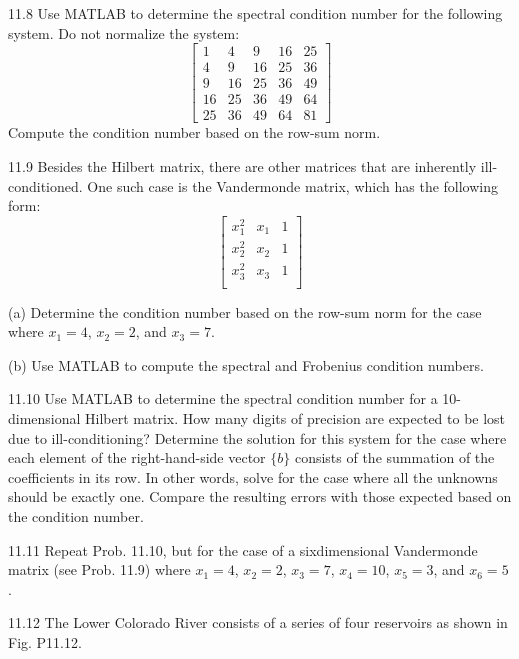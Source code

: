 \documentclass[../main.tex]{subfiles}
\begin{document}
11.8 Use MATLAB to determine the spectral condition number for the following system. Do not normalize the system:
\begin{equation}
\begin{bmatrix}
1& 4& 9& 16& 25\\
4& 9& 16& 25& 36\\
9& 16& 25& 36& 49\\
16& 25& 36& 49& 64\\
25& 36& 49& 64& 81
\end{bmatrix}
\end{equation}
Compute the condition number based on the row-sum norm.


11.9 Besides the Hilbert matrix, there are other matrices
that are inherently ill-conditioned. One such case is the
Vandermonde matrix, which has the following form:
\begin{equation}
\begin{bmatrix}
x_{1}^{2}& x_{1}& 1\\
x_{2}^{2}& x_{2}& 1\\
x_{3}^{2}& x_{3}& 1\\
\end{bmatrix}
\end{equation}

(a) Determine the condition number based on the row-sum
norm for the case where $x_{1} = 4$, $x_{2} = 2$, and $x_{3} = 7$.

(b) Use MATLAB to compute the spectral and Frobenius
condition numbers.


11.10 Use MATLAB to determine the spectral condition
number for a 10-dimensional Hilbert matrix. How many digits of precision are expected to be lost due to ill-conditioning?
Determine the solution for this system for the case where each
element of the right-hand-side vector $\{b\}$ consists of the summation of the coefficients in its row. In other words, solve for
the case where all the unknowns should be exactly one. Compare the resulting errors with those expected based on the
condition number.


11.11 Repeat Prob. 11.10, but for the case of a sixdimensional Vandermonde matrix (see Prob. 11.9) where
$x_{1} = 4$, $x_{2} = 2$, $x_{3} = 7$, $x_{4} = 10$, $x_{5} = 3$, and $x_{6} = 5$.


11.12 The Lower Colorado River consists of a series of four
reservoirs as shown in Fig. P11.12.
\end{document}
